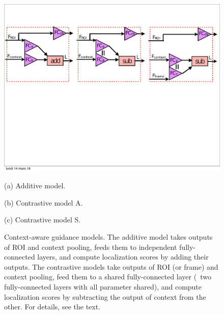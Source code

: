 
\begin{figure}[t] \includegraphics[width=\textwidth, trim={2mm 11.5cm 2mm 3cm},
clip]{images/variants-horiz} \begin{minipage}{0.32\linewidth} \centering
\small{(a) Additive model. } \end{minipage} \begin{minipage}{0.32\linewidth}
\centering \small{(b) Contrastive model A. } \end{minipage}
\begin{minipage}{0.32\linewidth} \centering \small{(c) Contrastive model S. }
\end{minipage}
\caption[small]{Context-aware guidance models.
The additive model takes outputs of ROI and context pooling, feeds them to independent fully-connected layers, and compute localization scores by adding their outputs.  
The contrastive models take outputs of ROI (or frame) and context pooling, feed them to a shared fully-connected layer (\ie~two fully-connected layers with all parameter shared), and compute localization scores by subtracting the output of context from the other. For details, see the text.}
\label{fig:models} \end{figure}




